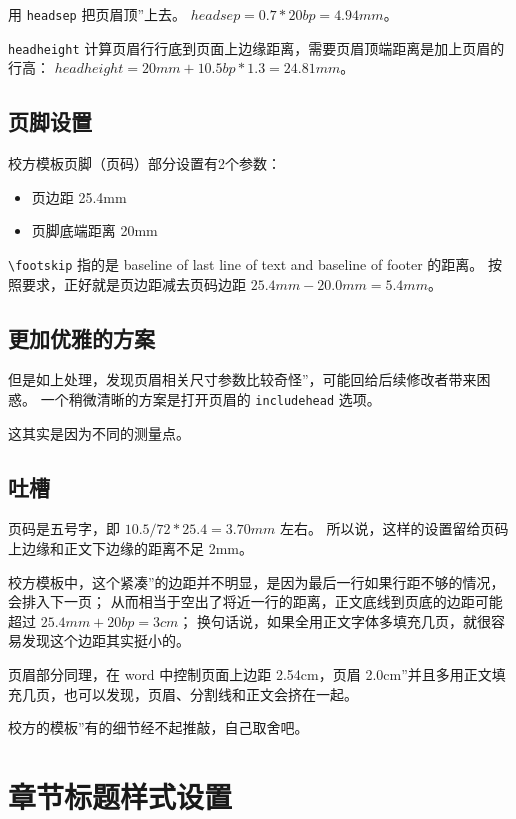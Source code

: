 \documentclass[../Main/thesis.tex]{subfiles}
\begin{document}
用 \texttt{headsep} 把页眉顶''上去。 \(headsep = 0.7*20bp = 4.94mm\)。

\texttt{headheight}
计算页眉行行底到页面上边缘距离，需要页眉顶端距离是加上页眉的行高：
\(headheight = 20mm + 10.5bp*1.3 = 24.81mm\)。

\subsection{页脚设置}
校方模板页脚（页码）部分设置有2个参数：
\begin{itemize}[\textbullet]
  \item 页边距 25.4mm
  \item 页脚底端距离 20mm
\end{itemize}

\texttt{\textbackslash{}footskip} 指的是 baseline of last line of text
and baseline of footer 的距离。 按照要求，正好就是页边距减去页码边距
\(25.4mm - 20.0mm = 5.4mm\)。

\subsection{更加优雅的方案}

但是如上处理，发现页眉相关尺寸参数比较奇怪''，可能回给后续修改者带来困惑。
一个稍微清晰的方案是打开页眉的 \texttt{includehead} 选项。

这其实是因为不同的测量点。

\subsection{吐槽}

页码是五号字，即 \(10.5/72*25.4 = 3.70mm\) 左右。
所以说，这样的设置留给页码上边缘和正文下边缘的距离不足 2mm。

校方模板中，这个紧凑''的边距并不明显，是因为最后一行如果行距不够的情况，会排入下一页；
从而相当于空出了将近一行的距离，正文底线到页底的边距可能超过
\(25.4mm + 20bp = 3cm\)；
换句话说，如果全用正文字体多填充几页，就很容易发现这个边距其实挺小的。

页眉部分同理，在 word 中控制页面上边距 2.54cm，页眉
2.0cm''并且多用正文填充几页，也可以发现，页眉、分割线和正文会挤在一起。

校方的模板''有的细节经不起推敲，自己取舍吧。

\section{章节标题样式设置}
\end{document}
